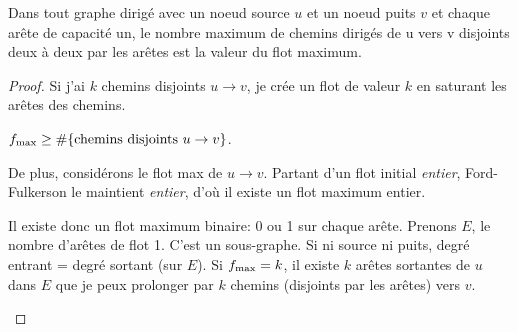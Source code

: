 \begin{mylem}
  \label{lem:flot_chemin}
  Dans tout graphe dirigé avec un noeud source $u$ et un noeud puits $v$ et chaque arête de capacité un, le nombre maximum de chemins dirigés de u vers v disjoints deux à deux par les arêtes est la valeur du flot maximum.
  \begin{proof}
    Si j'ai $k$ chemins disjoints $u \to v$,
    je crée un flot de valeur $k$ en saturant les arêtes
    des chemins.
    \begin{figure}[h!]
      \centering
    \end{figure}
    $f_\mathrm{max} \geq \#\{\text{chemins disjoints }u \to v\}$.

    De plus, considérons le flot max de $u \to v$.
    Partant d'un flot initial \emph{entier},
    Ford-Fulkerson le maintient \emph{entier},
    d'où il existe un flot maximum entier.

    Il existe donc un flot maximum binaire: 0 ou 1
    sur chaque arête.
    Prenons $E$, le nombre d'arêtes de flot 1.
    C'est un sous-graphe.
    Si ni source ni puits,
    degré entrant = degré sortant (sur $E$).
    Si $f_\mathrm{max} = k$,
    il existe $k$ arêtes sortantes de $u$ dans $E$ que
    je peux prolonger par $k$ chemins (disjoints par les arêtes)
    vers $v$.

    \begin{figure}[h!]
      \centering
    \end{figure}
  \end{proof}
\end{mylem}

